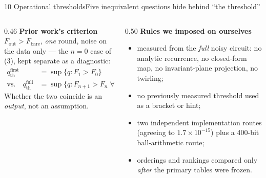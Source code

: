 \documentclass[aspectratio=169,10pt,t]{beamer}
\begin{document}
\begin{frame}{10 \quad Operational thresholds}{Five inequivalent questions hide behind ``the threshold''}
  \vspace{2.6ex}
  \begin{columns}[T,onlytextwidth]
  \begin{column}{0.46\textwidth}\vspace{0pt}
    \scriptsize
    \textbf{Prior work's criterion}\\[0.3ex]
    $F_{\mathrm{out}}>F_{\mathrm{bare}}$, \emph{one} round, noise on the data
    only --- the $n=0$ case of (3), kept separate as a diagnostic:
    \begin{align*}
      q_{\mathrm{th}}^{\mathrm{first}}&=\sup\{q: F_1>F_0\}\\
      \text{vs.}\quad
      q_{\mathrm{th}}^{\mathrm{full}}&=\sup\{q: F_{n+1}>F_n\;\forall n\}.
    \end{align*}
    Whether the two coincide is an \emph{output}, not an assumption.
  \end{column}
  \begin{column}{0.50\textwidth}\vspace{0pt}
    \scriptsize
    \textbf{Rules we imposed on ourselves}
    \begin{itemize}\itemsep0.3ex
      \item measured from the \emph{full} noisy circuit: no analytic
            recurrence, no closed-form map, no invariant-plane projection,
            no twirling;
      \item no previously measured threshold used as a bracket or hint;
      \item two independent implementation routes (agreeing to
            $1.7\times10^{-15}$) plus a 400-bit ball-arithmetic route;
      \item orderings and rankings compared only \emph{after} the primary
            tables were frozen.
    \end{itemize}
  \end{column}
  \end{columns}
\end{frame}
\end{document}
